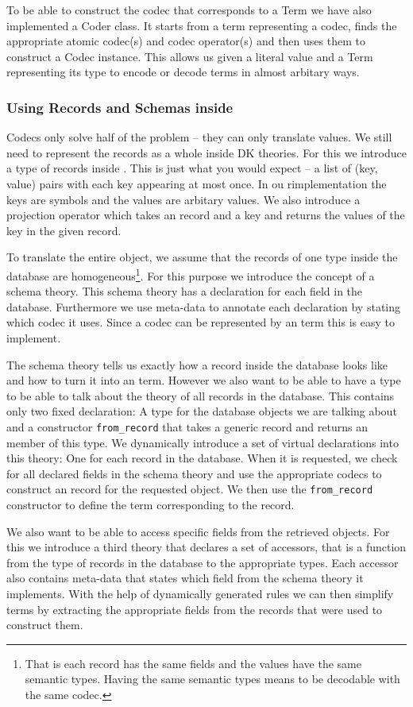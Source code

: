 To be able to construct the codec that corresponds to a Term we have also implemented a
Coder class. It starts from a term representing a codec, finds the
appropriate atomic codec(s) and codec operator(s) and then uses them to construct a Codec
instance. This allows us given a literal value and a Term representing its type to encode
or decode terms in almost arbitary ways.

\subsubsection{Using Records and Schemas inside \MMT}

Codecs only solve half of the problem -- they can only translate values. We still need to
represent the records as a whole inside DK theories. For this we introduce a type of
records inside \MMT. This is just what you would expect -- a list of (key, value) pairs
with each key appearing at most once. In ou rimplementation the keys are \MMT symbols and
the values are arbitary \MMT values. We also introduce a projection operator which takes
an \MMT record and a key and returns the values of the key in the given record.

To translate the entire object, we assume that the records of one type inside the database
are homogeneous\footnote{That is each record has the same fields and the values have the
  same semantic types. Having the same semantic types means to be decodable with the same
  codec. }. For this purpose we introduce the concept of a schema theory. This schema
theory has a declaration for each field in the database. Furthermore we use meta-data to
annotate each declaration by stating which codec it uses. Since a codec can be represented
by an \MMT term this is easy to implement.

The schema theory tells us exactly how a record inside the database looks like and how to
turn it into an \MMT term. However we also want to be able to have a type to be able to
talk about the theory of all records in the database. This contains only two fixed
declaration: A type for the database objects we are talking about and a constructor
\texttt{from\_record} that takes a generic
record and returns an member of this type. We dynamically introduce a set of virtual
declarations into this theory: One for each record in the database. When it is requested,
we check for all declared fields in the schema theory and use the appropriate codecs to
construct an \MMT record for the requested object. We then use the \texttt{from\_record}
constructor to define the \MMT term corresponding to the record.

We also want to be able to access specific fields from the retrieved objects. For this we
introduce a third theory that declares a set of accessors, that is a function from the
type of records in the database to the appropriate types. Each accessor also contains
meta-data that states which field from the schema theory it implements. With the help of
dynamically generated rules we can then simplify terms by extracting the appropriate
fields from the records that were used to construct them.

